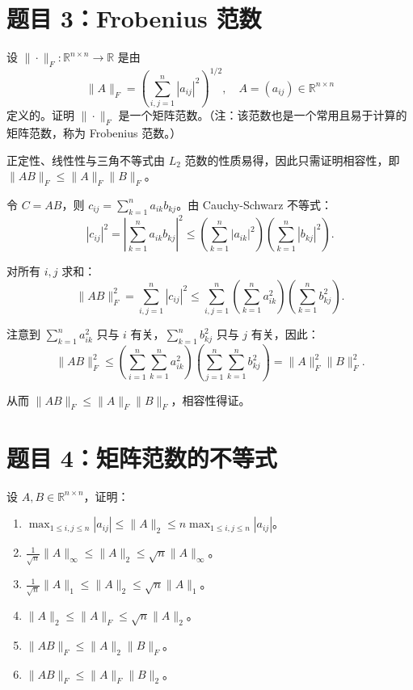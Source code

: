 \documentclass{article}
\begin{document}
\section{题目 3：Frobenius 范数}

设 $\|\cdot\|_F: \mathbb{R}^{n \times n} \to \mathbb{R}$ 是由
\[
  \|A\|_F = \left( \sum_{i,j=1}^{n} |a_{ij}|^2 \right)^{1/2}, \quad A
  = (a_{ij}) \in \mathbb{R}^{n \times n}
\]
定义的。证明 $\|\cdot\|_F$ 是一个矩阵范数。（注：该范数也是一个常用且易于计算的矩阵范数，称为 Frobenius 范数。）

\begin{solution}
  正定性、线性性与三角不等式由 $L_2$ 范数的性质易得，因此只需证明相容性，即 $\|AB\|_F \leq \|A\|_F \|B\|_F$。

  令 $C = AB$，则 $c_{ij} = \sum_{k=1}^{n} a_{ik} b_{kj}$。由 Cauchy-Schwarz 不等式：
  \[
    |c_{ij}|^2 = \left| \sum_{k=1}^{n} a_{ik} b_{kj} \right|^2 \leq
    \left( \sum_{k=1}^{n} |a_{ik}|^2 \right) \left( \sum_{k=1}^{n}
    |b_{kj}|^2 \right).
  \]

  对所有 $i, j$ 求和：
  \[
    \|AB\|_F^2 = \sum_{i,j=1}^{n} |c_{ij}|^2 \leq \sum_{i,j=1}^{n}
    \left( \sum_{k=1}^{n} a_{ik}^2 \right) \left( \sum_{k=1}^{n}
    b_{kj}^2 \right).
  \]

  注意到 $\sum_{k=1}^{n} a_{ik}^2$ 只与 $i$ 有关，$\sum_{k=1}^{n} b_{kj}^2$
  只与 $j$ 有关，因此：
  \[
    \|AB\|_F^2 \leq \left( \sum_{i=1}^{n} \sum_{k=1}^{n} a_{ik}^2
    \right) \left( \sum_{j=1}^{n} \sum_{k=1}^{n} b_{kj}^2 \right) =
    \|A\|_F^2 \|B\|_F^2.
  \]

  从而 $\|AB\|_F \leq \|A\|_F \|B\|_F$，相容性得证。

\end{solution}

\section{题目 4：矩阵范数的不等式}

设 $A, B \in \mathbb{R}^{n \times n}$，证明：
\begin{enumerate}
  \item $\max_{1 \leq i,j \leq n} |a_{ij}| \leq \|A\|_2 \leq n
    \max_{1 \leq i,j \leq n} |a_{ij}|$。
  \item $\frac{1}{\sqrt{n}} \|A\|_\infty \leq \|A\|_2 \leq
    \sqrt{n}\|A\|_\infty$。
  \item $\frac{1}{\sqrt{n}} \|A\|_1 \leq \|A\|_2 \leq \sqrt{n}\|A\|_1$。
  \item $\|A\|_2 \leq \|A\|_F \leq \sqrt{n}\|A\|_2$。
  \item $\|AB\|_F \leq \|A\|_2\|B\|_F$。
  \item $\|AB\|_F \leq \|A\|_F\|B\|_2$。
\end{enumerate}
\end{document}
